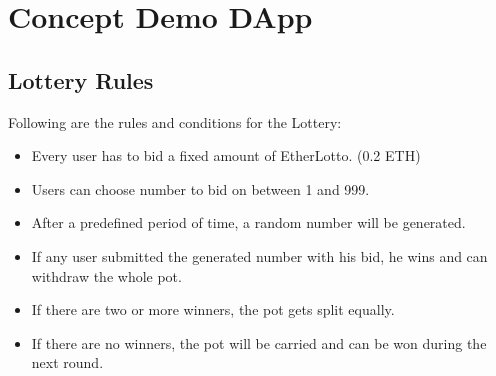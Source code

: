 \chapter{Concept Demo \ac{DApp}}\label{chap:concept}
\chapterstart



\section{Lottery Rules}\label{sec:rules}

Following are the rules and conditions for the Lottery:
\begin{itemize}
    \item Every user has to bid a fixed amount of EtherLotto. (0.2 ETH)
    \item Users can choose number to bid on between 1 and 999.
    \item After a predefined period of time, a random number will be generated.
    \item If any user submitted the generated number with his bid, he wins and can withdraw the whole pot.
    \item If there are two or more winners, the pot gets split equally.
    \item If there are no winners, the pot will be carried and can be won during the next round.
\end{itemize}

\chapterend

